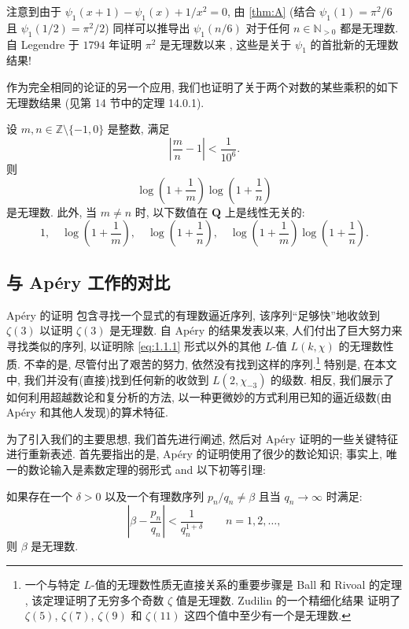 注意到由于 $\psi_1(x+1) - \psi_1(x) + 1/x^2 = 0$, 
由 \autoref{thm:A} 
(结合 $\psi_1(1) = \pi^2/6$ 且 $\psi_1(1/2) = \pi^2/2$)
同样可以推导出 $\psi_1(n/6)$ 对于任何 $n \in \mathbb{N}_{>0}$ 都是无理数.
自 Legendre 于 $1794$ 年证明 $\pi^2$ 是无理数以来 \cite{Leg1794}, 这些是关于 $\psi_1$ 的首批新的无理数结果!

作为完全相同的论证的另一个应用, 我们也证明了关于两个对数的某些乘积的如下无理数结果 (见第 14 节中的定理 14.0.1).

\begin{maintheorem}\label{thm:C}
设 $m, n \in \mathbb{Z} \setminus \{-1, 0\}$ 是整数, 满足 
\[ \left| \frac{m}{n} - 1 \right| < \frac{1}{10^6}. \]
则
\[ \log \left( 1 + \frac{1}{m} \right) \log \left( 1 + \frac{1}{n} \right) \]
是无理数. 
此外, 当 $m \neq n$ 时, 以下数值在 $\mathbf{Q}$ 上是线性无关的:
\[ 1, \quad \log\left(1+\frac{1}{m}\right), \quad \log\left(1+\frac{1}{n}\right), \quad \log\left(1+\frac{1}{m}\right)\log\left(1+\frac{1}{n}\right). \]
\end{maintheorem}

\subsection{与 Ap{\'e}ry 工作的对比}\label{sec:1.2}

Ap{\'e}ry 的证明 \cite{vdP79} 包含寻找一个显式的有理数逼近序列, 该序列``足够快''地收敛到 $\zeta(3)$ 以证明 $\zeta(3)$ 是无理数.
自 Ap{\'e}ry 的结果发表以来, 人们付出了巨大努力来寻找类似的序列, 以证明除 \eqref{eq:1.1.1} 形式以外的其他 $L$-值 $L(k, \chi)$ 的无理数性质.
不幸的是, 尽管付出了艰苦的努力, 依然没有找到这样的序列.\footnote{一个与特定 $L$-值的无理数性质无直接关系的重要步骤是 Ball 和 Rivoal 的定理 \cite{Riv00}\cite{BR01}, 该定理证明了无穷多个奇数 $\zeta$ 值是无理数. Zudilin 的一个精细化结果 \cite{Zud01} 证明了 $\zeta(5)$, $\zeta(7)$, $\zeta(9)$ 和 $\zeta(11)$ 这四个值中至少有一个是无理数.}
特别是, 在本文中, 我们并没有(直接)找到任何新的收敛到 $L(2, \chi_{-3})$ 的级数.
相反, 我们展示了如何利用超越数论和复分析的方法, 以一种更微妙的方式利用已知的逼近级数(由 Ap{\'e}ry 和其他人发现)的算术特征.

为了引入我们的主要思想, 我们首先进行阐述, 然后对 Ap{\'e}ry 证明的一些关键特征进行重新表述.
首先要指出的是, Ap{\'e}ry 的证明使用了很少的数论知识;
事实上, 唯一的数论输入是素数定理的弱形式 and 以下初等引理:

\begin{lemma}\label{lem:1.2.1}
如果存在一个 $\delta > 0$ 以及一个有理数序列 $p_n/q_n \neq \beta$ 且当 $q_n \to \infty$ 时满足:
\[ \left|\beta - \frac{p_n}{q_n}\right| < \frac{1}{q_n^{1+\delta}} \qquad n = 1, 2, \dots, \]
则 $\beta$ 是无理数.
\end{lemma}

